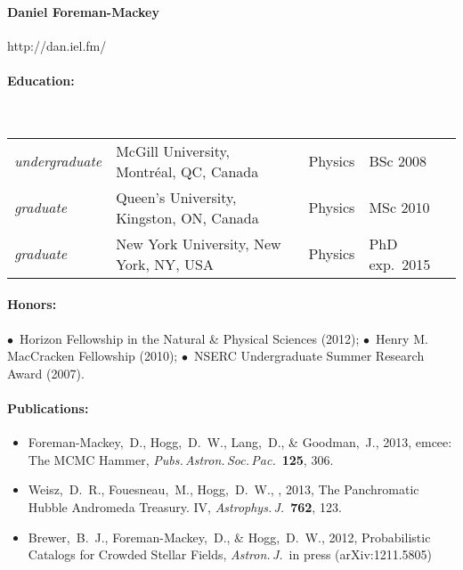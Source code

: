 \documentclass[letterpaper,12pt]{article}
\begin{document}
\paragraph{Daniel Foreman-Mackey} http://dan.iel.fm/

\paragraph{Education:}~\\
\begin{tabular}{llll}
\textsl{undergraduate}
  & McGill University, Montr\'eal, QC, Canada & Physics & BSc 2008\\
\textsl{graduate}
  & Queen's University, Kingston, ON, Canada & Physics & MSc 2010\\
\textsl{graduate}
  & New York University, New York, NY, USA & Physics & PhD exp.\ 2015
\end{tabular}

\paragraph{Honors:}
$\bullet$~Horizon Fellowship in the Natural \& Physical Sciences (2012);
$\bullet$~Henry M. MacCracken Fellowship (2010);
$\bullet$~NSERC Undergraduate Summer Research Award (2007).

\paragraph{Publications:}
\begin{itemize}\setlength{\itemsep}{0pt}
\item
Foreman-Mackey,~D., Hogg,~D.~W., Lang,~D., \& Goodman,~J., 2013,
emcee: The MCMC Hammer, \textit{Pubs.\,Astron.\,Soc.\,Pac.}\ \textbf{125}, 306.
\item
Weisz,~D.~R., Fouesneau,~M., Hogg,~D.~W., \etal, 2013,
The Panchromatic Hubble Andromeda Treasury. IV,
\textit{Astrophys.\,J.}\ \textbf{762}, 123.
\item
Brewer,~B.~J., Foreman-Mackey,~D., \& Hogg,~D.~W., 2012,
Probabilistic Catalogs for Crowded Stellar Fields,
\textit{Astron.\,J.}\ in press (arXiv:1211.5805)
\end{itemize}
\end{document}
